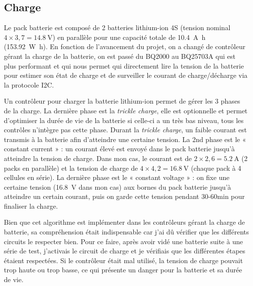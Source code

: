 \documentclass[a4paper, 11pt]{report}
\begin{document}
\subsection{Charge}
Le pack batterie est composé de 2 batteries lithium-ion 4S (tension nominal $4\times3,7=\SI{14.8}{\volt}$) en parallèle pour une capacité totale de \SI{10.4}{\ampere\hour} (\SI{153.92}{\watt\hour}). En fonction de l’avancement du projet, on a changé de contrôleur gérant la charge de la batterie, on est passé du BQ2000 au BQ25703A qui est plus performant et qui nous permet qui directement lire la tension de la batterie pour estimer son état de charge et de surveiller le courant de charge/décharge via la protocole I2C.

Un contrôleur pour charger la batterie lithium-ion permet de gérer les 3 phases de la charge. La dernière phase est la \emph{trickle charge}, elle est optionnelle et permet d’optimiser la durée de vie de la batterie si celle-ci a un très bas niveau, tous les contrôles n’intègre pas cette phase. Durant la \emph{trickle charge}, un faible courant est transmis à la batterie afin d’atteindre une certaine tension. La 2nd phase est le « constant current » : un courant élevé est envoyé dans le pack batterie jusqu’à atteindre la tension de charge. Dans mon cas, le courant est de $2\times2,6 = \SI{5.2}{\ampere}$ (2 packs en parallèle) et la tension de charge de $4\times4,2 = \SI{16.8}{\volt}$ (chaque pack à 4 cellules en série). La dernière phase est le « constant voltage » : on fixe une certaine tension (\SI{16.8}{\volt} dans mon cas) aux bornes du pack batterie jusqu’à atteindre un certain courant, puis on garde cette tension pendant 30-60min pour finaliser la charge.

Bien que cet algorithme est implémenter dans les contrôleurs gérant la charge de batterie, sa compréhension était indispensable car j'ai dû vérifier que les différents circuits le respecter bien. Pour ce faire, après avoir vidé une batterie suite à une série de test, j'activais le circuit de charge et je vérifiais que les différentes étapes étaient respectées. Si le contrôleur était mal utilisé, la tension de charge pouvait trop haute ou trop basse, ce qui présente un danger pour la batterie et sa durée de vie.
\end{document}
